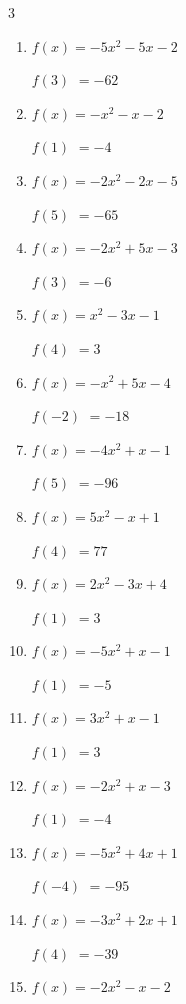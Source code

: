 \begin{multicols}{3}
\begin{enumerate}
$f(4)$
        $= 14$

\columnbreak %

\resetques

  \item $f(x)=-5x^{2}-5x-2$

$f(3)$
        $= -62$

  \item $f(x)=-x^{2}-x-2$

$f(1)$
        $= -4$

  \item $f(x)=-2x^{2}-2x-5$

$f(5)$
        $= -65$

  \item $f(x)=-2x^{2}+5x-3$

$f(3)$
        $= -6$

  \item $f(x)=x^{2}-3x-1$

$f(4)$
        $= 3$

  \item $f(x)=-x^{2}+5x-4$

$f(-2)$
        $= -18$

  \item $f(x)=-4x^{2}+x-1$

$f(5)$
        $= -96$

  \item $f(x)=5x^{2}-x+1$

$f(4)$
        $= 77$

  \item $f(x)=2x^{2}-3x+4$

$f(1)$
        $= 3$

  \item $f(x)=-5x^{2}+x-1$

$f(1)$
        $= -5$

  \item $f(x)=3x^{2}+x-1$

$f(1)$
        $= 3$

  \item $f(x)=-2x^{2}+x-3$

$f(1)$
        $= -4$

  \item $f(x)=-5x^{2}+4x+1$

$f(-4)$
        $= -95$

  \item $f(x)=-3x^{2}+2x+1$

$f(4)$
        $= -39$

  \item $f(x)=-2x^{2}-x-2$


\end{enumerate}
\end{multicols}
